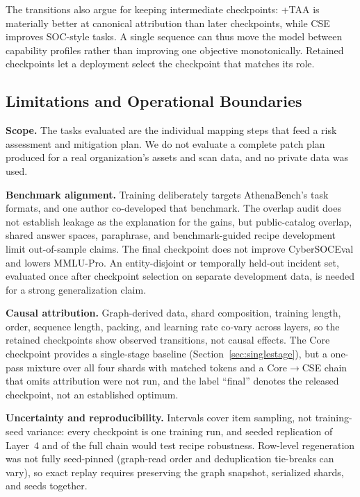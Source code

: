\documentclass[conference]{IEEEtran}
\begin{document}
The transitions also argue for keeping intermediate checkpoints: +TAA is materially better at canonical attribution than later checkpoints, while CSE improves SOC-style tasks. A single sequence can thus move the model between capability profiles rather than improving one objective monotonically. Retained checkpoints let a deployment select the checkpoint that matches its role.

\subsection{Limitations and Operational Boundaries}\label{sec:limits}
\textbf{Scope.} The tasks evaluated are the individual mapping steps that feed a risk assessment and mitigation plan. We do not evaluate a complete patch plan produced for a real organization's assets and scan data, and no private data was used.

\textbf{Benchmark alignment.} Training deliberately targets AthenaBench's task formats, and one author co-developed that benchmark. The overlap audit does not establish leakage as the explanation for the gains, but public-catalog overlap, shared answer spaces, paraphrase, and benchmark-guided recipe development limit out-of-sample claims. The final checkpoint does not improve CyberSOCEval and lowers MMLU-Pro. An entity-disjoint or temporally held-out incident set, evaluated once after checkpoint selection on separate development data, is needed for a strong generalization claim.

\textbf{Causal attribution.} Graph-derived data, shard composition, training length, order, sequence length, packing, and learning rate co-vary across layers, so the retained checkpoints show observed transitions, not causal effects. The Core checkpoint provides a single-stage baseline (Section~\ref{sec:singlestage}), but a one-pass mixture over all four shards with matched tokens and a Core$\rightarrow$CSE chain that omits attribution were not run, and the label ``final'' denotes the released checkpoint, not an established optimum.

\textbf{Uncertainty and reproducibility.} Intervals cover item sampling, not training-seed variance: every checkpoint is one training run, and seeded replication of Layer~4 and of the full chain would test recipe robustness.
Row-level regeneration was not fully seed-pinned (graph-read order and deduplication tie-breaks can vary), so exact replay requires preserving the graph snapshot, serialized shards, and seeds together.
\end{document}
